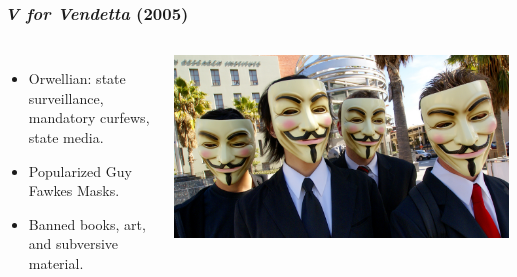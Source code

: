 \documentclass{beamer}
\begin{document}
\begin{frame}
\frametitle{\emph{V for Vendetta} (2005)}

\begin{columns}[c] %
    \begin{itemize}

      \item Orwellian: state surveillance, mandatory curfews, state media.
      \item Popularized Guy Fawkes Masks.
      \item Banned books, art, and subversive material.
    \end{itemize}

    \includegraphics[width=\textwidth,height=0.6\textheight,keepaspectratio]{img/guy_fawkes}


\end{columns}
\end{frame}
\end{document}
